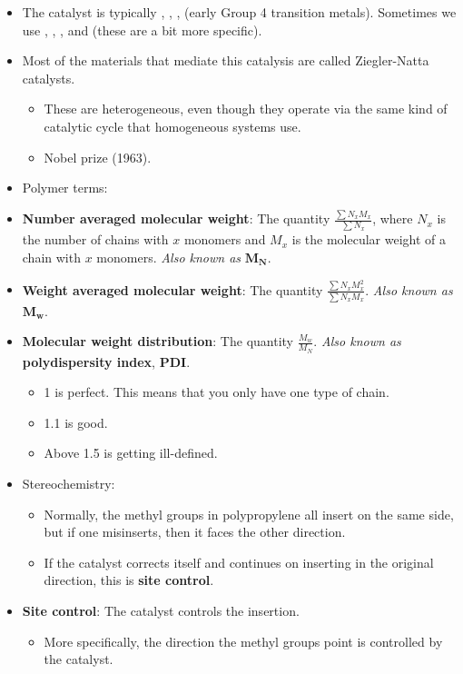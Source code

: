 \documentclass[../notes.tex]{subfiles}
\begin{document}
\begin{itemize}
    \item The catalyst is typically , , ,  (early Group 4 transition metals). Sometimes we use , , , and  (these are a bit more specific).
    \item Most of the materials that mediate this catalysis are called Ziegler-Natta catalysts.
    \begin{itemize}
        \item These are heterogeneous, even though they operate via the same kind of catalytic cycle that homogeneous systems use.
        \item Nobel prize (1963).
    \end{itemize}
    \item Polymer terms:
    \item \textbf{Number averaged molecular weight}: The quantity $\frac{\sum N_xM_x}{\sum N_x}$, where $N_x$ is the number of chains with $x$ monomers and $M_x$ is the molecular weight of a chain with $x$ monomers. \emph{Also known as} $\bm{M_N}$.
    \item \textbf{Weight averaged molecular weight}: The quantity $\frac{\sum N_xM_x^2}{\sum N_xM_x}$. \emph{Also known as} $\bm{M_w}$.
    \item \textbf{Molecular weight distribution}: The quantity $\frac{M_w}{M_N}$. \emph{Also known as} \textbf{polydispersity index}, \textbf{PDI}.
    \begin{itemize}
        \item 1 is perfect. This means that you only have one type of chain.
        \item 1.1 is good.
        \item Above 1.5 is getting ill-defined.
    \end{itemize}
    \item Stereochemistry:
    \begin{itemize}
        \item Normally, the methyl groups in polypropylene all insert on the same side, but if one misinserts, then it faces the other direction.
        \item If the catalyst corrects itself and continues on inserting in the original direction, this is \textbf{site control}.
    \end{itemize}
    \item \textbf{Site control}: The catalyst controls the insertion.
    \begin{itemize}
        \item More specifically, the direction the methyl groups point is controlled by the catalyst.

\end{itemize}
\end{itemize}
\end{document}
